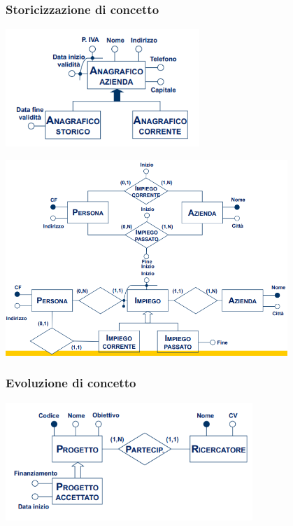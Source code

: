 \documentclass[12pt]{article}
\begin{document}
\subsubsection{Storicizzazione di concetto}
\begin{center}
    \includegraphics[width = 0.55\textwidth]{Images/52.PNG}
\end{center}
\begin{center}
    \includegraphics[width = 0.80\textwidth]{Images/53.PNG}
\end{center}
\subsubsection{Evoluzione di concetto}
\begin{center}
    \includegraphics[width = 0.70\textwidth]{Images/54.PNG}
\end{center}
\end{document}
